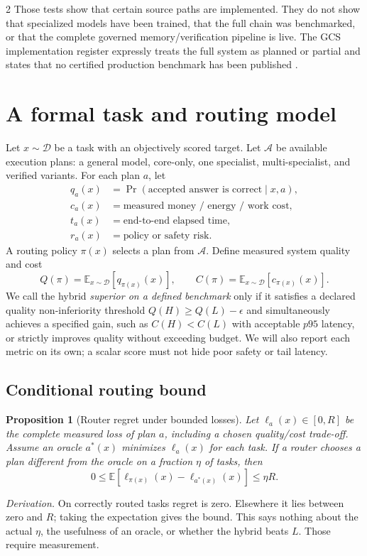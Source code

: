 \documentclass[10pt,letterpaper]{article}
\newtheorem{proposition}{Proposition}
\newcommand{\expect}{\mathbb{E}}
\begin{document}
\begin{multicols}{2}
Those tests show that certain source paths are implemented. They do not show that specialized models have been trained, that the full chain was benchmarked, or that the complete governed memory/verification pipeline is live. The GCS implementation register expressly treats the full system as planned or partial and states that no certified production benchmark has been published \cite{gcsstatus,gcsbench}.

\section{A formal task and routing model}
Let $x\sim\mathcal D$ be a task with an objectively scored target. Let $\mathcal A$ be available execution plans: a general model, core-only, one specialist, multi-specialist, and verified variants. For each plan $a$, let
\begin{align}
q_a(x)&=\Pr(\text{accepted answer is correct}\mid x,a),\\
c_a(x)&=\text{measured money / energy / work cost},\\
t_a(x)&=\text{end-to-end elapsed time},\\
r_a(x)&=\text{policy or safety risk}.
\end{align}
A routing policy $\pi(x)$ selects a plan from $\mathcal A$. Define measured system quality and cost
\begin{equation}
Q(\pi)=\expect_{x\sim\mathcal D}[q_{\pi(x)}(x)],\qquad
C(\pi)=\expect_{x\sim\mathcal D}[c_{\pi(x)}(x)].
\label{eq:quality}
\end{equation}
We call the hybrid \emph{superior on a defined benchmark} only if it satisfies a declared quality non-inferiority threshold $Q(H)\ge Q(L)-\epsilon$ and simultaneously achieves a specified gain, such as $C(H)<C(L)$ with acceptable $p95$ latency, or strictly improves quality without exceeding budget. We will also report each metric on its own; a scalar score must not hide poor safety or tail latency.

\subsection{Conditional routing bound}
\begin{proposition}[Router regret under bounded losses]
Let $\ell_a(x)\in[0,R]$ be the complete measured loss of plan $a$, including a chosen quality/cost trade-off. Assume an oracle $a^*(x)$ minimizes $\ell_a(x)$ for each task. If a router chooses a plan different from the oracle on a fraction $\eta$ of tasks, then
\begin{equation}
0\le\expect[\ell_{\pi(x)}(x)-\ell_{a^*(x)}(x)]\le\eta R.
\end{equation}
\end{proposition}
\noindent\emph{Derivation.} On correctly routed tasks regret is zero. Elsewhere it lies between zero and $R$; taking the expectation gives the bound. This says nothing about the actual $\eta$, the usefulness of an oracle, or whether the hybrid beats $L$. Those require measurement.


\end{multicols}
\end{document}
